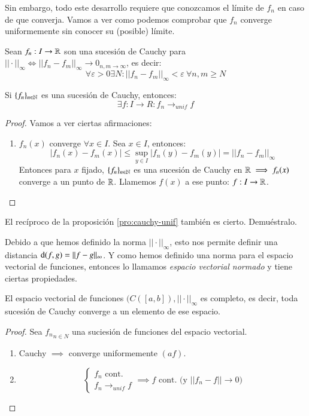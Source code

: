 Sin embargo, todo este desarrollo requiere que conozcamos el límite de $f_n$ en caso de que converja. Vamos a ver como podemos comprobar que $f_n$ converge uniformemente sin conocer su (posible) límite.
\begin{dfn}
    Sean $f_n : I \to \mathbb{R}$ son una sucesión de Cauchy para $||\cdot||_\infty \iff ||f_n - f_m||_\infty \to 0_{n,m \to \infty}$, es decir:
    $$
        \forall \varepsilon > 0 \exists N : ||f_n - f_m||_\infty < \varepsilon\ \forall n,m \geq N
    $$
\end{dfn}
\begin{pro}\label{pro:cauchy-unif}
    Si $\{f_n\}_{n\in\mathbb{N}}$ es una sucesión de Cauchy, entonces:
    $$
        \exists f : I \to R : f_n \to_{unif} f
    $$
\end{pro}
\begin{proof}
    Vamos a ver ciertas afirmaciones:
    \begin{enumerate}
        \item $f_n(x)$ converge $\forall x \in I$. Sea $x\in I$, entonces:
        $$
            |f_n(x) - f_m(x) | \leq \sup_{y\in I} |f_n(y) - f_m(y)| = ||f_n - f_m||_\infty
        $$
        Entonces para $x$ fijado, $\{f_n\}_{n\in\mathbb{N}}$ es una sucesión de Cauchy en $\mathbb{R} \implies f_n(x)$ converge a un punto de $\mathbb{R}$. Llamemos $f(x)$ a ese punto: $f : I \to \mathbb{R}$.
    \end{enumerate}
\end{proof}
\begin{th_ex}
    El recíproco de la proposición \ref{pro:cauchy-unif} también es cierto. Demuéstralo.
\end{th_ex}
Debido a que hemos definido la norma $||\cdot||_\infty$, esto nos permite definir una distancia $\mathrm{d}(f, g) = || f -g || _\infty$. Y como hemos definido una norma para el espacio vectorial de funciones, entonces lo llamamos \textit{espacio vectorial normado} y tiene ciertas propiedades.
\begin{pro}
    El espacio vectorial de funciones $(C([a, b]), ||\cdot||_\infty$ es completo, es decir, toda sucesión de Cauchy converge a un elemento de ese espacio.
\end{pro}
\begin{proof}
    Sea ${f_n}_{n\in N}$ una suciesión de funciones del espacio vectorial.
    \begin{enumerate}
        \item Cauchy $\implies$ converge uniformemente $( a f)$.
        \item
            $$
                \begin{cases}
                    f_n \text{ cont.}\\
                    f_n \to_{unif} f
                \end{cases} \implies f \text{ cont. (y $||f_n - f|| \to 0$)}
            $$
    \end{enumerate}
\end{proof}
